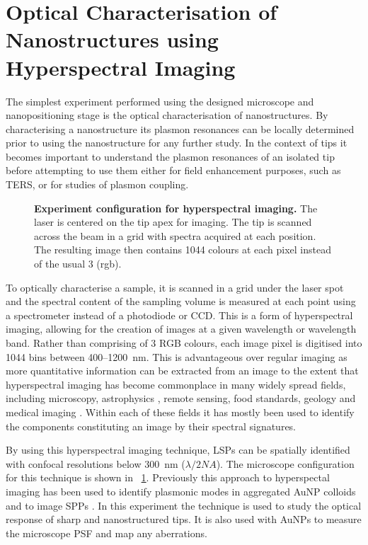 \documentclass{book}
\begin{document}
\section{Optical Characterisation of Nanostructures using Hyperspectral Imaging}
\label{sec:hyperspectral_imaging}

The simplest experiment performed using the designed microscope and nanopositioning stage is the optical characterisation of nanostructures. By characterising a nanostructure its plasmon resonances can be locally determined prior to using the nanostructure for any further study. In the context of tips it becomes important to understand the plasmon resonances of an isolated tip before attempting to use them either for field enhancement purposes, such as TERS, or for studies of plasmon coupling.

\begin{figure}[h]
\centering
{}
{\caption[Experiment configuration for hyperspectral imaging]{\textbf{Experiment configuration for hyperspectral imaging.} The laser is centered on the tip apex for imaging. The tip is scanned across the beam in a grid with spectra acquired at each position. The resulting image then contains 1044 colours at each pixel instead of the usual 3 (rgb).}
\label{fig:simple_optics_layout}}
\end{figure}

To optically characterise a sample, it is scanned in a grid under the laser spot and the spectral content of the sampling volume is measured at each point using a spectrometer instead of a photodiode or CCD. This is a form of hyperspectral imaging, allowing for the creation of images at a given wavelength or wavelength band. Rather than comprising of 3 RGB colours, each image pixel is digitised into 1044 bins between 400--\SI{1200}{nm}.
This is advantageous over regular imaging as more quantitative information can be extracted from an image to the extent that hyperspectral imaging has become commonplace in many widely spread fields, including microscopy, astrophysics \cite{hege2004hyperspectral}, remote sensing, food standards, geology and medical imaging \cite{vo2004hyperspectral, lu2014medical}. Within each of these fields it has mostly been used to identify the components constituting an image by their spectral signatures.

By using this hyperspectral imaging technique, LSPs can be spatially identified with confocal resolutions below \SI{300}{nm} ($\lambda/2\mathit{NA}$). The microscope configuration for this technique is shown in \figurename~\ref{fig:simple_optics_layout}. Previously this approach to hyperspectal imaging has been used to identify plasmonic modes in aggregated AuNP colloids \cite{herrmann2013} and to image SPPs \cite{bashevoy2007hyperspectral}. In this experiment the technique is used to study the optical response of sharp and nanostructured tips. It is also used with AuNPs to measure the microscope PSF and map any aberrations.
\end{document}
